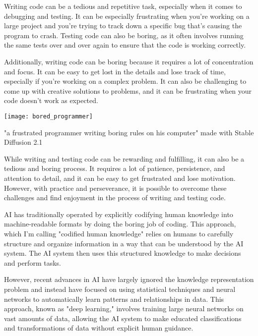 Writing code can be a tedious and repetitive task, especially when it comes to debugging and testing. It can be especially frustrating when you're working on a large project and you're trying to track down a specific bug that's causing the program to crash. Testing code can also be boring, as it often involves running the same tests over and over again to ensure that the code is working correctly.

Additionally, writing code can be boring because it requires a lot of concentration and focus. It can be easy to get lost in the details and lose track of time, especially if you're working on a complex problem. It can also be challenging to come up with creative solutions to problems, and it can be frustrating when your code doesn't work as expected.

\begin{marginfigure}[-5.5cm]
        \texttt{[image: bored\_programmer]}
        \caption{"a frustrated programmer writing boring rules on his computer" made with Stable Diffusion 2.1}
\end{marginfigure}

While writing and testing code can be rewarding and fulfilling, it can also be a tedious and boring process. It requires a lot of patience, persistence, and attention to detail, and it can be easy to get frustrated and lose motivation. However, with practice and perseverance, it is possible to overcome these challenges and find enjoyment in the process of writing and testing code.

AI has traditionally operated by explicitly codifying human knowledge into machine-readable formats by doing the boring job of coding. This approach, which I'm calling "codified human knowledge" relies on humans to carefully structure and organize information in a way that can be understood by the AI system. The AI system then uses this structured knowledge to make decisions and perform tasks.

However, recent advances in AI have largely ignored the knowledge representation problem and instead have focused on using statistical techniques and neural networks to automatically learn patterns and relationships in data. This approach, known as "deep learning," involves training large neural networks on vast amounts of data, allowing the AI system to make educated classifications and transformations of data without explicit human guidance.

